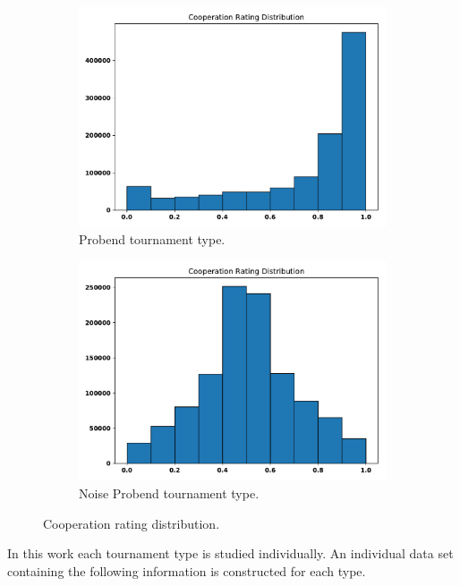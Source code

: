 \documentclass{article}
\begin{document}
\begin{figure}
\begin{subfigure}{0.45\textwidth}
        \includegraphics[width=\textwidth]{images/cooperation_distribution_probend}
        \caption{Probend tournament type.}
    \end{subfigure}
    \begin{subfigure}{0.45\textwidth}
        \includegraphics[width=\textwidth]{images/cooperation_distribution_noise_probend}
        \caption{Noise Probend tournament type.}
    \end{subfigure}
    \caption{Cooperation rating distribution.}\label{fig:cooperation_distributions}
\end{figure}

In this work each tournament type is studied individually. An individual data set
containing the following information is constructed for each type.
\end{document}
